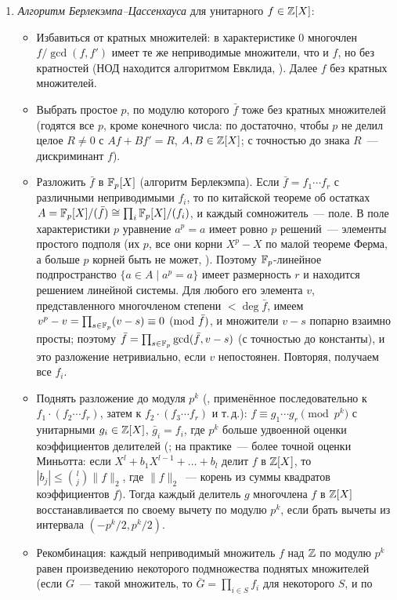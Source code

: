 \begin{aside}
\begin{enumerate}[leftmargin=*,label=\arabic*.]
\item \emph{Алгоритм Берлекэмпа--Цассенхауса} для унитарного $f\in\mathbb Z[X]$:
\begin{itemize}[leftmargin=*]
\item Избавиться от кратных множителей: в характеристике $0$ многочлен $f/\gcd(f,f')$ имеет те же неприводимые множители,
что и $f$, но без кратностей (НОД находится алгоритмом Евклида, ). Далее $f$ без кратных множителей.
\item Выбрать простое $p$, по модулю которого $\bar f$ тоже без кратных множителей (годятся все $p$, кроме конечного
числа: по  достаточно, чтобы $p$ не делил целое $R\ne0$ с $Af+Bf'=R$, $A,B\in\mathbb Z[X]$; с точностью до знака $R$~---
дискриминант $f$).
\item Разложить $\bar f$ в $\mathbb F_p[X]$ (алгоритм Берлекэмпа). Если $\bar f=f_1\cdots f_r$ с различными неприводимыми $f_i$, то
по китайской теореме об остатках $A=\mathbb F_p[X]/(\bar f)\cong\prod_i\mathbb F_p[X]/(f_i)$, и каждый сомножитель~--- поле. В поле
характеристики $p$ уравнение $a^p=a$ имеет ровно $p$ решений~--- элементы простого подполя (их $p$, все они корни $X^p-X$
по малой теореме Ферма, а больше $p$ корней быть не может, ). Поэтому $\mathbb F_p$-линейное подпространство
$\{a\in A\mid a^p=a\}$ имеет размерность $r$ и находится решением линейной системы. Для любого его элемента $v$,
представленного многочленом степени $<\deg\bar f$, имеем $v^p-v=\prod_{s\in\mathbb F_p}(v-s)\equiv0\pmod{\bar f}$, и множители
$v-s$ попарно взаимно просты; поэтому $\bar f=\prod_{s\in\mathbb F_p}\gcd(\bar f,v-s)$ (с точностью до константы), и это разложение
нетривиально, если $v$ непостоянен. Повторяя, получаем все $f_i$.
\item Поднять разложение до модуля $p^k$ (, применённое последовательно к $f_1\cdot(f_2\cdots f_r)$,
затем к $f_2\cdot(f_3\cdots f_r)$ и т.\,д.): $f\equiv g_1\cdots g_r\pmod{p^k}$ с унитарными $g_i\in\mathbb Z[X]$, $\bar g_i=f_i$, где $p^k$ больше удвоенной оценки коэффициентов делителей
(; на практике~--- более точной оценки Миньотта: если $X^l+b_1X^{l-1}+\dots+b_l$ делит $f$ в $\mathbb Z[X]$, то
$|b_j|\le\binom lj\|f\|_2$, где $\|f\|_2$~--- корень из суммы квадратов коэффициентов $f$). Тогда каждый делитель $g$ многочлена $f$ в $\mathbb Z[X]$
восстанавливается по своему вычету по модулю $p^k$, если брать вычеты из интервала $(-p^k/2,p^k/2)$.
\item Рекомбинация: каждый неприводимый множитель $f$ над $\mathbb Z$ по модулю $p^k$ равен произведению некоторого подмножества
поднятых множителей (если $G$~--- такой множитель, то $\bar G=\prod_{i\in S}f_i$ для некоторого $S$, и по

\end{itemize}
\end{enumerate}
\end{aside}
